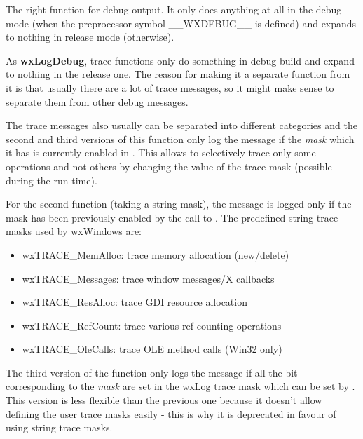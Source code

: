The right function for debug output. It only does anything at all in the debug
mode (when the preprocessor symbol \_\_WXDEBUG\_\_ is defined) and expands to
nothing in release mode (otherwise).

\label{wxlogtrace}




As {\bf wxLogDebug}, trace functions only do something in debug build and
expand to nothing in the release one. The reason for making
it a separate function from it is that usually there are a lot of trace
messages, so it might make sense to separate them from other debug messages.

The trace messages also usually can be separated into different categories and
the second and third versions of this function only log the message if the 
{\it mask} which it has is currently enabled in . This
allows to selectively trace only some operations and not others by changing
the value of the trace mask (possible during the run-time).

For the second function (taking a string mask), the message is logged only if
the mask has been previously enabled by the call to 
. The predefined string trace masks
used by wxWindows are:

\begin{itemize}\itemsep=0pt
\item wxTRACE\_MemAlloc: trace memory allocation (new/delete)
\item wxTRACE\_Messages: trace window messages/X callbacks
\item wxTRACE\_ResAlloc: trace GDI resource allocation
\item wxTRACE\_RefCount: trace various ref counting operations
\item wxTRACE\_OleCalls: trace OLE method calls (Win32 only)
\end{itemize}

The third version of the function only logs the message if all the bit
corresponding to the {\it mask} are set in the wxLog trace mask which can be
set by . This version is less
flexible than the previous one because it doesn't allow defining the user
trace masks easily - this is why it is deprecated in favour of using string
trace masks.

